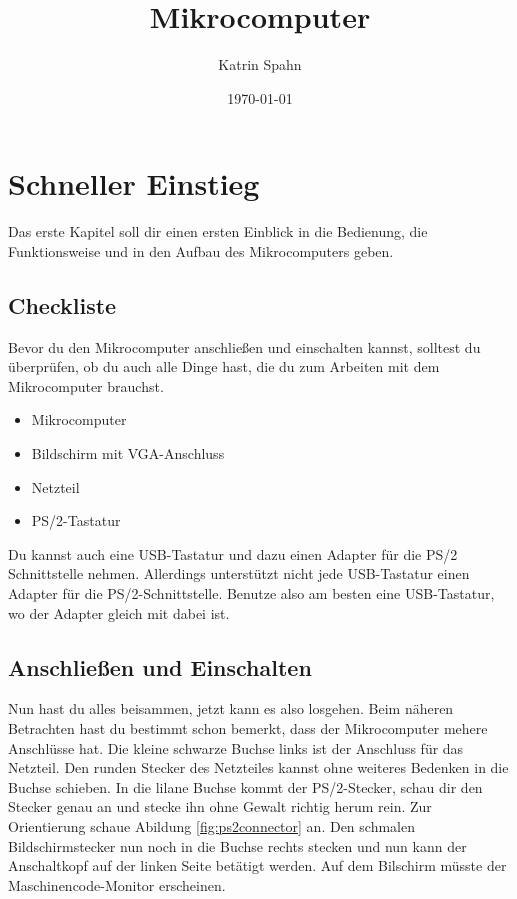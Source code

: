\documentclass[10pt]{book}
\title{Mikrocomputer}
\author{Katrin Spahn}
\date{\today}
\begin{document}
\maketitle

\tableofcontents

\chapter{Schneller Einstieg}

Das erste Kapitel soll dir einen ersten Einblick
in die Bedienung, die Funktionsweise
und in den Aufbau des Mikrocomputers geben.

\section{Checkliste}
Bevor du den Mikrocomputer anschließen und einschalten
kannst, solltest du überprüfen, ob du auch alle Dinge
hast, die du zum Arbeiten mit dem Mikrocomputer brauchst.

\begin{itemize}
\item Mikrocomputer
\item Bildschirm mit VGA-Anschluss
\item Netzteil
\item PS/2-Tastatur 

\end{itemize}
Du kannst auch eine USB-Tastatur
und dazu einen Adapter für die
PS/2 Schnittstelle nehmen.
Allerdings unterstützt nicht jede USB-Tastatur
einen Adapter für die PS/2-Schnittstelle.
Benutze also am besten eine USB-Tastatur,
wo der Adapter gleich mit dabei ist.


\section{Anschließen und Einschalten}
Nun hast du alles beisammen, jetzt kann es also losgehen.
Beim näheren Betrachten hast du bestimmt schon bemerkt,
dass der Mikrocomputer mehere Anschlüsse hat.
Die kleine schwarze Buchse links
ist der Anschluss für das Netzteil.
Den runden Stecker des Netzteiles kannst
ohne weiteres Bedenken in die Buchse schieben.
In die lilane Buchse kommt der PS/2-Stecker,
schau dir den Stecker genau an und stecke ihn
ohne Gewalt richtig herum rein.
Zur Orientierung schaue
Abildung \ref{fig:ps2connector} an.
Den schmalen Bildschirmstecker nun noch
in die Buchse rechts stecken
und nun kann der Anschaltkopf
auf der linken Seite betätigt werden.
Auf dem Bilschirm müsste der
Maschinencode-Monitor erscheinen.
\end{document}
